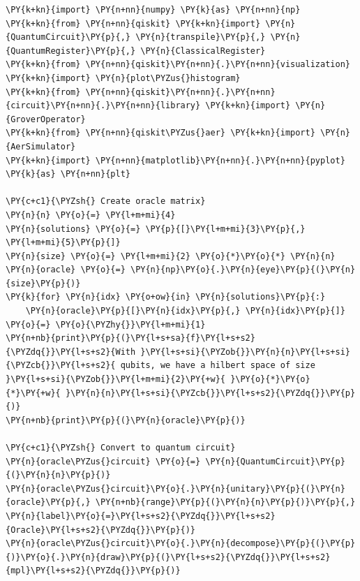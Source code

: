     \begin{tcolorbox}[breakable, size=fbox, boxrule=1pt, pad at break*=1mm,colback=cellbackground, colframe=cellborder]
\begin{Verbatim}[commandchars=\\\{\}]
\PY{k+kn}{import} \PY{n+nn}{numpy} \PY{k}{as} \PY{n+nn}{np}
\PY{k+kn}{from} \PY{n+nn}{qiskit} \PY{k+kn}{import} \PY{n}{QuantumCircuit}\PY{p}{,} \PY{n}{transpile}\PY{p}{,} \PY{n}{QuantumRegister}\PY{p}{,} \PY{n}{ClassicalRegister}
\PY{k+kn}{from} \PY{n+nn}{qiskit}\PY{n+nn}{.}\PY{n+nn}{visualization} \PY{k+kn}{import} \PY{n}{plot\PYZus{}histogram}
\PY{k+kn}{from} \PY{n+nn}{qiskit}\PY{n+nn}{.}\PY{n+nn}{circuit}\PY{n+nn}{.}\PY{n+nn}{library} \PY{k+kn}{import} \PY{n}{GroverOperator}
\PY{k+kn}{from} \PY{n+nn}{qiskit\PYZus{}aer} \PY{k+kn}{import} \PY{n}{AerSimulator}
\PY{k+kn}{import} \PY{n+nn}{matplotlib}\PY{n+nn}{.}\PY{n+nn}{pyplot} \PY{k}{as} \PY{n+nn}{plt}

\PY{c+c1}{\PYZsh{} Create oracle matrix}
\PY{n}{n} \PY{o}{=} \PY{l+m+mi}{4}
\PY{n}{solutions} \PY{o}{=} \PY{p}{[}\PY{l+m+mi}{3}\PY{p}{,} \PY{l+m+mi}{5}\PY{p}{]}
\PY{n}{size} \PY{o}{=} \PY{l+m+mi}{2} \PY{o}{*}\PY{o}{*} \PY{n}{n}
\PY{n}{oracle} \PY{o}{=} \PY{n}{np}\PY{o}{.}\PY{n}{eye}\PY{p}{(}\PY{n}{size}\PY{p}{)}
\PY{k}{for} \PY{n}{idx} \PY{o+ow}{in} \PY{n}{solutions}\PY{p}{:}
    \PY{n}{oracle}\PY{p}{[}\PY{n}{idx}\PY{p}{,} \PY{n}{idx}\PY{p}{]} \PY{o}{=} \PY{o}{\PYZhy{}}\PY{l+m+mi}{1}
\PY{n+nb}{print}\PY{p}{(}\PY{l+s+sa}{f}\PY{l+s+s2}{\PYZdq{}}\PY{l+s+s2}{With }\PY{l+s+si}{\PYZob{}}\PY{n}{n}\PY{l+s+si}{\PYZcb{}}\PY{l+s+s2}{ qubits, we have a hilbert space of size }\PY{l+s+si}{\PYZob{}}\PY{l+m+mi}{2}\PY{+w}{ }\PY{o}{*}\PY{o}{*}\PY{+w}{ }\PY{n}{n}\PY{l+s+si}{\PYZcb{}}\PY{l+s+s2}{\PYZdq{}}\PY{p}{)}
\PY{n+nb}{print}\PY{p}{(}\PY{n}{oracle}\PY{p}{)}

\PY{c+c1}{\PYZsh{} Convert to quantum circuit}
\PY{n}{oracle\PYZus{}circuit} \PY{o}{=} \PY{n}{QuantumCircuit}\PY{p}{(}\PY{n}{n}\PY{p}{)}
\PY{n}{oracle\PYZus{}circuit}\PY{o}{.}\PY{n}{unitary}\PY{p}{(}\PY{n}{oracle}\PY{p}{,} \PY{n+nb}{range}\PY{p}{(}\PY{n}{n}\PY{p}{)}\PY{p}{,} \PY{n}{label}\PY{o}{=}\PY{l+s+s2}{\PYZdq{}}\PY{l+s+s2}{Oracle}\PY{l+s+s2}{\PYZdq{}}\PY{p}{)}
\PY{n}{oracle\PYZus{}circuit}\PY{o}{.}\PY{n}{decompose}\PY{p}{(}\PY{p}{)}\PY{o}{.}\PY{n}{draw}\PY{p}{(}\PY{l+s+s2}{\PYZdq{}}\PY{l+s+s2}{mpl}\PY{l+s+s2}{\PYZdq{}}\PY{p}{)}
\end{Verbatim}
\end{tcolorbox}

